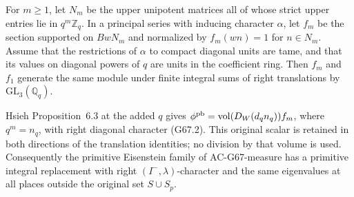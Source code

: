 \begin{lemma}
\label{AC-G67-local}
For $m\ge1$, let $N_m$ be the upper unipotent matrices all of
whose strict upper entries lie in $q^m\mathbb Z_q$.  In a
principal series with inducing character $\alpha$, let $f_m$
be the section supported on $BwN_m$ and normalized by
$f_m(wn)=1$ for $n\in N_m$.  Assume that the restrictions of
$\alpha$ to compact diagonal units are tame, and that its
values on diagonal powers of $q$ are units in the coefficient
ring.  Then $f_m$ and $f_1$ generate the same module under
finite integral sums of right translations by
$\mathrm{GL}_3(\mathbb Q_q)$.

Hsieh Proposition~6.3 at the added $q$ gives
$\phi^{\rm pb}=\operatorname{vol}(D_W(d_qn_q))f_m$,
where $q^m=n_q$, with right diagonal character (G67.2).
This original scalar is retained in both directions of the
translation identities; no division by that volume is used.
Consequently the primitive Eisenstein family of
AC-G67-measure has a primitive integral replacement with
right $(I^-,\lambda)$-character and the same eigenvalues at
all places outside the original set $S\cup S_p$.
\end{lemma}
